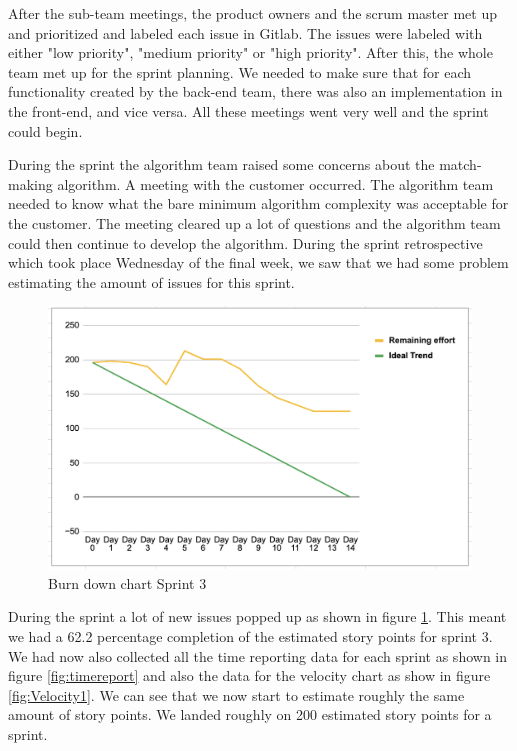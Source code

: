 \documentclass{article}
\begin{document}
After the sub-team meetings, the product owners and the scrum master met up and prioritized and labeled each issue in Gitlab. The issues were labeled with either "low priority", "medium priority" or "high priority". After this, the whole team met up for the sprint planning. We needed to make sure that for each functionality created by the back-end team, there was also an implementation in the front-end, and vice versa. All these meetings went very well and the sprint could begin.

During the sprint the algorithm team raised some concerns about the match-making algorithm. A meeting with the customer occurred. The algorithm team needed to know what the bare minimum algorithm complexity was acceptable for the customer. The meeting cleared up a lot of questions and the algorithm team could then continue to develop the algorithm. During the sprint retrospective which took place Wednesday of the final week, we saw that we had some problem estimating the amount of issues for this sprint. 

\begin{figure}[h!]
    \centering
    \includegraphics[scale=0.6]{pfrFigures/Sprint3.png}
    \caption{Burn down chart Sprint 3}
    \label{fig:Burndown3}
\end{figure}

During the sprint a lot of new issues popped up as shown in figure \ref{fig:Burndown3}. This meant we had a 62.2 percentage completion of the estimated story points for sprint 3. We had now also collected all the time reporting data for each sprint as shown in figure \ref{fig:timereport} and also the data for the velocity chart as show in figure \ref{fig:Velocity1}. We can see that we now start to estimate roughly the same amount of story points. We landed roughly on 200 estimated story points for a sprint. 
\end{document}
